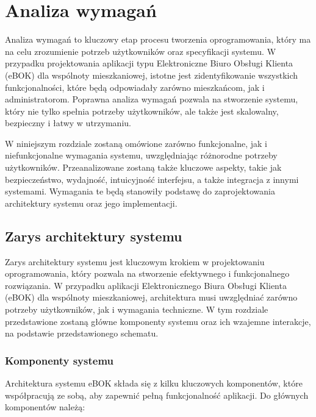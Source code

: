 \chapter{Analiza wymagań}

Analiza wymagań to kluczowy etap procesu tworzenia oprogramowania, który ma na celu zrozumienie potrzeb użytkowników oraz specyfikacji systemu. W przypadku projektowania aplikacji typu Elektroniczne Biuro Obsługi Klienta (eBOK) dla wspólnoty mieszkaniowej, istotne jest zidentyfikowanie wszystkich funkcjonalności, które będą odpowiadały zarówno mieszkańcom, jak i administratorom. Poprawna analiza wymagań pozwala na stworzenie systemu, który nie tylko spełnia potrzeby użytkowników, ale także jest skalowalny, bezpieczny i łatwy w utrzymaniu.

W niniejszym rozdziale zostaną omówione zarówno funkcjonalne, jak i niefunkcjonalne wymagania systemu, uwzględniając różnorodne potrzeby użytkowników. Przeanalizowane zostaną także kluczowe aspekty, takie jak bezpieczeństwo, wydajność, intuicyjność interfejsu, a także integracja z innymi systemami. Wymagania te będą stanowiły podstawę do zaprojektowania architektury systemu oraz jego implementacji.

\section{Zarys architektury systemu}

Zarys architektury systemu jest kluczowym krokiem w projektowaniu oprogramowania, który pozwala na stworzenie efektywnego i funkcjonalnego rozwiązania. W przypadku aplikacji Elektronicznego Biura Obsługi Klienta (eBOK) dla wspólnoty mieszkaniowej, architektura musi uwzględniać zarówno potrzeby użytkowników, jak i wymagania techniczne. W tym rozdziale przedstawione zostaną główne komponenty systemu oraz ich wzajemne interakcje, na podstawie przedstawionego schematu.

\subsection{Komponenty systemu}

Architektura systemu eBOK składa się z kilku kluczowych komponentów, które współpracują ze sobą, aby zapewnić pełną funkcjonalność aplikacji. Do głównych komponentów należą:

